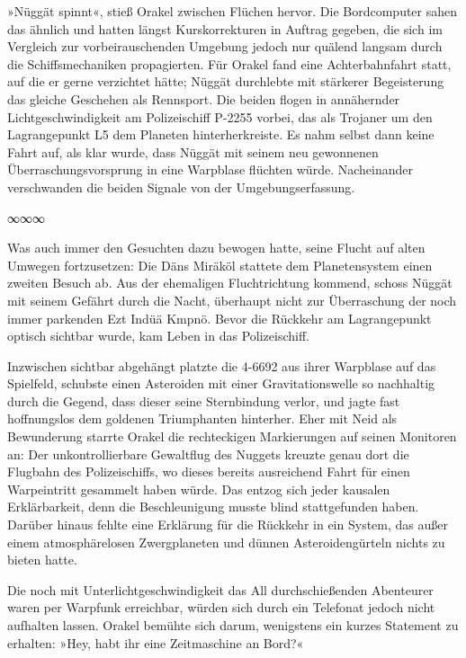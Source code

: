 »Nüggät spinnt«, stieß Orakel zwischen Flüchen hervor. Die Bordcomputer sahen das ähnlich und hatten längst Kurskorrekturen in Auftrag gegeben, die sich im Vergleich zur vorbeirauschenden Umgebung jedoch nur quälend langsam durch die Schiffsmechaniken propagierten. Für Orakel fand eine Achterbahnfahrt statt, auf die er gerne verzichtet hätte; Nüggät durchlebte mit stärkerer Begeisterung das gleiche Geschehen als Rennsport. Die beiden flogen in annähernder Lichtgeschwindigkeit am Polizeischiff P-2255 vorbei, das als Trojaner um den Lagrangepunkt L5 dem Planeten hinterherkreiste. Es nahm selbst dann keine Fahrt auf, als klar wurde, dass Nüggät mit seinem neu gewonnenen Überraschungsvorsprung in eine Warpblase flüchten würde. Nacheinander verschwanden die beiden Signale von der Umgebungserfassung.

\begin{center}
∞∞∞
\end{center}

Was auch immer den Gesuchten dazu bewogen hatte, seine Flucht auf alten Umwegen fortzusetzen: Die Däns Miräköl stattete dem Planetensystem einen zweiten Besuch ab. Aus der ehemaligen Fluchtrichtung kommend, schoss Nüggät mit seinem Gefährt durch die Nacht, überhaupt nicht zur Überraschung der noch immer parkenden Ezt Indüä Kmpnö. Bevor die Rückkehr am Lagrangepunkt optisch sichtbar wurde, kam Leben in das Polizeischiff.

Inzwischen sichtbar abgehängt platzte die 4-6692 aus ihrer Warpblase auf das Spielfeld, schubste einen Asteroiden mit einer Gravitationswelle so nachhaltig durch die Gegend, dass dieser seine Sternbindung verlor, und jagte fast hoffnungslos dem goldenen Triumphanten hinterher. Eher mit Neid als Bewunderung starrte Orakel die rechteckigen Markierungen auf seinen Monitoren an: Der unkontrollierbare Gewaltflug des Nuggets kreuzte genau dort die Flugbahn des Polizeischiffs, wo dieses bereits ausreichend Fahrt für einen Warpeintritt gesammelt haben würde. Das entzog sich jeder kausalen Erklärbarkeit, denn die Beschleunigung musste blind stattgefunden haben. Darüber hinaus fehlte eine Erklärung für die Rückkehr in ein System, das außer einem atmosphärelosen Zwergplaneten und dünnen Asteroidengürteln nichts zu bieten hatte.

Die noch mit Unterlichtgeschwindigkeit das All durchschießenden Abenteurer waren per Warpfunk erreichbar, würden sich durch ein Telefonat jedoch nicht aufhalten lassen. Orakel bemühte sich darum, wenigstens ein kurzes Statement zu erhalten: »Hey, habt ihr eine Zeitmaschine an Bord?«

